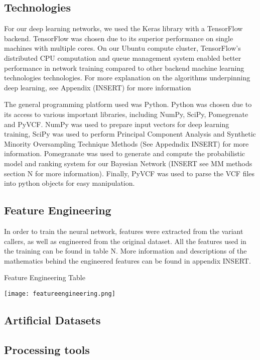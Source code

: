 \documentclass{article}
\begin{document}
\subsection{Technologies}
For our deep learning networks, we used the Keras library with a TensorFlow backend. TensorFlow was chosen due to its superior performance on single machines with multiple cores. On our Ubuntu compute cluster, TensorFlow's distributed CPU computation and queue management system enabled better performance in network training compared to other backend machine learning technologies technologies. For more explanation on the algorithms underpinning deep learning, see Appendix (INSERT) for more information 

The general programming platform used was Python. Python was chosen due to its access to various important libraries, including NumPy, SciPy, Pomegrenate and PyVCF. NumPy was used to prepare input vectors for deep learning training, SciPy was used to perform Principal Component Analysis and Synthetic Minority Oversampling Technique Methods (See Appedndix INSERT) for more information. Pomegranate was used to generate and compute the probabilistic model and ranking system for our Bayesian Network (INSERT see MM methods section N for more information). Finally, PyVCF was used to parse the VCF files into python objects for easy manipulation.

\subsection{Feature Engineering}
In order to train the neural network, features were extracted from the variant callers, as well as engineered from the original dataset. All the features used in the training can be found in table N. More information and descriptions of the mathematics behind the engineered features can be found in appendix INSERT.

\begin{table}[]
\caption{Feature Engineering Table}
\texttt{[image: featureengineering.png]}
\centering
\end{table}


\subsection{Artificial Datasets}

\subsection{Processing tools}
\end{document}
